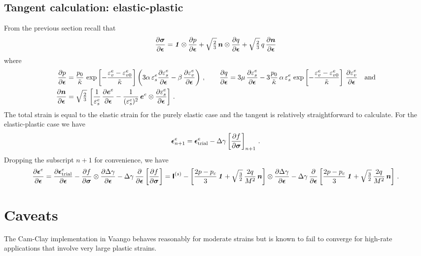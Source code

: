 \subsection{Tangent calculation: elastic-plastic}
From the previous section recall that 
\[
   \Partial{\Bsig}{\Beps} = \Bone\otimes\Partial{p}{\Beps} + 
      \sqrt{\tfrac{2}{3}}\,\BnT\otimes\Partial{q}{\Beps} + 
      \sqrt{\tfrac{2}{3}}\,q\,\Partial{\BnT}{\Beps}  
\]
where
\[
  \Bal
  \Partial{p}{\Beps} & = \frac{p_0}{\kappatilde}\,
      \exp\left[-\frac{\Ve^e_v - \Ve^e_{v0}}{\kappatilde}\right]\left(3\alpha\,\Ve^e_s\Partial{\Ve^e_s}{\Beps} -
            \beta\,\Partial{\Ve^e_v}{\Beps} \right) \,,\qquad
  \Partial{q}{\Beps}  = 3\mu\,\Partial{\Ve^e_s}{\Beps} - 3\frac{p_0}{\kappatilde}\,\alpha\,\Ve^e_s \,
      \exp\left[-\frac{\Ve^e_v - \Ve^e_{v0}}{\kappatilde}\right]\,\Partial{\Ve^e_v}{\Beps} \quad \Tand \\
   \Partial{\BnT}{\Beps} & = \sqrt{\tfrac{2}{3}}\,\left[\frac{1}{\Ve^e_s}\,\Partial{\BeT^e}{\Beps}
     - \frac{1}{(\Ve^e_s)^2}\,\BeT^e\otimes\Partial{\Ve^e_s}{\Beps}\right] \,.
  \Eal
\]
The total strain is equal to the elastic strain for the purely elastic case and the tangent is relatively
straightforward to calculate.  For the elastic-plastic case we have
\[
   \Beps^e_{n+1} = \Beps^e_\Trial - \Delta\gamma\left[\Partial{f}{\Bsig}\right]_{n+1} \,.
\]
Dropping the subscript $n+1$ for convenience, we have
\[
   \Partial{\Beps^e}{\Beps} = \Partial{\Beps^e_\Trial}{\Beps} 
     - \Partial{f}{\Bsig}\otimes\Partial{\Delta\gamma}{\Beps}
     - \Delta\gamma\,\Partial{}{\Beps}\left[\Partial{f}{\Bsig}\right]
     = \SfI^{(s)}
     - \left[\frac{2p-p_c}{3}\,\Bone + \sqrt{\tfrac{3}{2}}\,\frac{2q}{M^2}\,\BnT\right]
       \otimes\Partial{\Delta\gamma}{\Beps}
     - \Delta\gamma\,\Partial{}{\Beps}
     \left[\frac{2p-p_c}{3}\,\Bone + \sqrt{\tfrac{3}{2}}\,\frac{2q}{M^2}\,\BnT\right] \,.
\]

\section{Caveats}
The Cam-Clay implementation in Vaango behaves reasonably for moderate strains but is
known to fail to converge for high-rate applications that involve very large plastic
strains.

